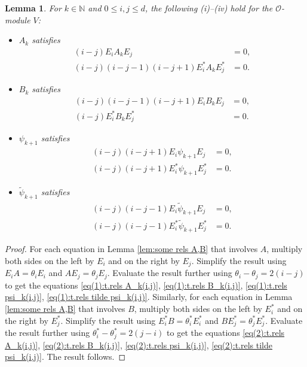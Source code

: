 \documentclass[11pt]{article}%
\theoremstyle{definition}
\theoremstyle{plain}
\newtheorem{lemma}[definition]{Lemma}
\begin{document}
\begin{lemma}\label{lem:triple rels}
For $k \in \mathbb{N}$ and $0 \leq i,j \leq d$, the following {\rm(i)}--{\rm(iv)} hold for the $\mathcal{O}$-module $V$:
\begin{itemize}
\item[\rm(i)] $A_k$ satisfies
	\begin{align}
		(i - j) E_iA_kE_j & = 0, \label{eq(1):t.rels A_k(i,j)}\\
		(i - j)(i - j - 1)(i - j + 1) E_i^*A_kE_j^* & = 0. \label{eq(2):t.rels A_k(i,j)}
	\end{align}
\item[\rm(ii)] $B_k$ satisfies
	\begin{align}
		(i - j)(i - j - 1)(i - j + 1) E_iB_kE_j & = 0, \label{eq(1):t.rels B_k(i,j)}\\
		(i - j) E^*_iB_kE_j^* & = 0. \label{eq(2):t.rels B_k(i,j)}
	\end{align}
\item[\rm(iii)] $\psi_{k+1}$ satisfies
	\begin{align}
		(i - j)(i - j + 1) E_i \psi_{k+1} E_j & = 0, \label{eq(1):t.rels psi_k(i,j)}\\
		(i - j)(i - j + 1) E_i^* \psi_{k+1} E_j^* & = 0. \label{eq(2):t.rels psi_k(i,j)}
	\end{align}	
\item[\rm(iv)] $\tilde\psi_{k+1}$ satisfies
	\begin{align}
		(i - j)(i - j - 1) E_i \tilde\psi_{k+1} E_j & = 0, \label{eq(1):t.rels tilde psi_k(i,j)}\\
		(i - j)(i - j - 1) E_i^* \tilde\psi_{k+1} E_j^* & = 0. \label{eq(2):t.rels tilde psi_k(i,j)}
	\end{align}	
\end{itemize}
\end{lemma}
\begin{proof}
For each equation in Lemma \ref{lem:some rels A,B} that involves $A$, multiply both sides  on the left by $E_i$ and on the right by $E_j$.
Simplify the result using $E_iA = \theta_i E_i$ and $AE_j = \theta_j E_j$.
Evaluate the result further using $\theta_i - \theta_j = 2(i - j)$ to get the equations \eqref{eq(1):t.rels A_k(i,j)}, \eqref{eq(1):t.rels B_k(i,j)}, \eqref{eq(1):t.rels psi_k(i,j)}, \eqref{eq(1):t.rels tilde psi_k(i,j)}.
Similarly, for each equation in Lemma \ref{lem:some rels A,B} that involves $B$, multiply both sides on the left by $E^*_i$ and on the right by $E_j^*$.
Simplify the result using $E_i^*B = \theta_i^* E_i^*$ and $BE_j^* = \theta_j^* E_j^*$.
Evaluate the result further using $\theta_i^* - \theta_j^* = 2(j - i)$ to get the equations \eqref{eq(2):t.rels A_k(i,j)}, \eqref{eq(2):t.rels B_k(i,j)}, \eqref{eq(2):t.rels psi_k(i,j)}, \eqref{eq(2):t.rels tilde psi_k(i,j)}.
The result follows.
\end{proof}
\end{document}
